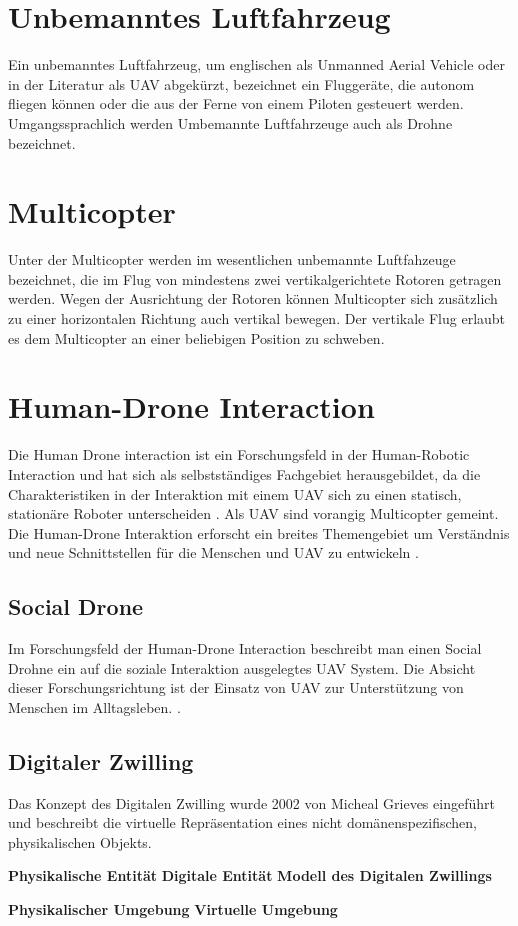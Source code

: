 
\section{Unbemanntes Luftfahrzeug}
Ein unbemanntes Luftfahrzeug, um englischen als Unmanned Aerial Vehicle oder in der Literatur als UAV abgekürzt, bezeichnet ein Fluggeräte, die autonom fliegen können oder die aus der Ferne von einem Piloten gesteuert werden. Umgangssprachlich werden Umbemannte Luftfahrzeuge auch als Drohne bezeichnet.

\section{Multicopter}
Unter der Multicopter werden im wesentlichen unbemannte Luftfahzeuge bezeichnet, die im Flug von mindestens zwei vertikalgerichtete Rotoren getragen werden. Wegen der Ausrichtung der Rotoren können Multicopter sich zusätzlich zu einer horizontalen Richtung auch vertikal bewegen. Der vertikale Flug erlaubt es dem Multicopter an einer beliebigen Position zu schweben. 


\section{Human-Drone Interaction}
Die Human Drone interaction ist ein Forschungsfeld in der  Human-Robotic Interaction und hat sich als selbstständiges Fachgebiet herausgebildet, da die Charakteristiken in der Interaktion mit einem UAV sich zu einen statisch, stationäre Roboter unterscheiden \cite{Tezza2019TheStaOfArtHumDro}. Als UAV sind vorangig Multicopter gemeint.
Die Human-Drone Interaktion erforscht ein breites Themengebiet um Verständnis und neue Schnittstellen für die Menschen und UAV zu entwickeln .

\subsection{Social Drone}
Im Forschungsfeld der Human-Drone Interaction beschreibt man einen Social Drohne ein auf die soziale Interaktion ausgelegtes UAV System. Die Absicht dieser Forschungsrichtung ist der Einsatz von UAV zur Unterstützung von Menschen im Alltagsleben. \cite{Ghafu2021SocCom}.

\subsection{Digitaler Zwilling}

Das Konzept des Digitalen Zwilling wurde 2002 von Micheal Grieves eingeführt und beschreibt die virtuelle Repräsentation eines nicht domänenspezifischen, physikalischen Objekts.

\textbf{Physikalische Entität}
\textbf{Digitale Entität}
\textbf{Modell des Digitalen Zwillings}

\textbf{Physikalischer Umgebung}
\textbf{Virtuelle Umgebung}




